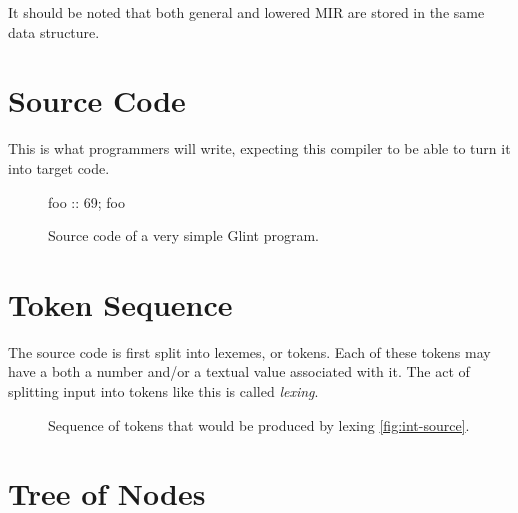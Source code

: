 \documentclass[12pt]{article}
\begin{document}
\noindent It should be noted that both general and lowered MIR are stored in the same data structure.

\section{Source Code}
\label{sec:source-code}

This is what programmers will write, expecting this compiler to be able to turn it into target code.

\begin{figure}[h]
  \centering
  foo :: 69; foo
  \caption{Source code of a very simple Glint program.}
  \label{fig:int-source}
\end{figure}
\FloatBarrier

\section{Token Sequence}
\label{sec:tokens}

The source code is first split into lexemes, or tokens. Each of these tokens may have a both a number and/or a textual value associated with it. The act of splitting input into tokens like this is called \emph{lexing}.

\begin{figure}[h]
  \centering
  \caption{Sequence of tokens that would be produced by lexing \autoref{fig:int-source}.}
  \label{fig:int-tokens}
\end{figure}
\FloatBarrier

\section{Tree of Nodes}
\label{sec:node-tree}
\end{document}
